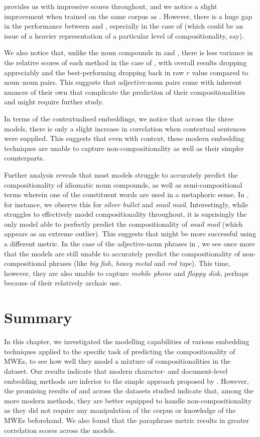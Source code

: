 \fasttext provides us with impressive scores throughout, and we notice a slight improvement when trained on the same corpus as \wordtovec. However, there is a huge gap in the performance between \wordtovec and \fasttext, especially in the case of \reddy (which could be an issue of a heavier representation of a particular level of compositionality, say).

We also notice that, unlike the noun compounds in \reddy and \ramisch, there is less variance in the relative scores of each method in the case of \discoj[ADJ], with overall results dropping appreciably and the best-performing \wordtovec dropping back in raw $r$ value compared to noun--noun pairs. This suggests that adjective-noun pairs come with inherent nuances of their own that complicate the prediction of their compositionalities and might require further study.

In terms of the contextualised embeddings, we notice that across the three models, there is only a slight increase in correlation when contextual sentences were supplied. This suggests that even with context, these modern embedding techniques are unable to capture non-compositionality as well as their simpler counterparts. 

Further analysis reveals that most models struggle to accurately predict the compositionality of idiomatic noun compounds, as well as semi-compositional terms wherein one of the constituent words are used in a metaphoric sense. In \reddy, for instance, we observe this for \textit{silver bullet} and \textit{snail mail}. Interestingly, while \bert struggles to effectively model compositionality throughout, it is suprisingly the only model able to perfectly predict the compositionality of \textit{snail mail} (which appears as an extreme outlier). This suggests that \bert might be more successful using a different metric. In the case of the adjective-noun phrases in \discoj, we see once more that the models are still unable to accurately predict the compositionality of non-compositional phrases (like \textit{big fish, heavy metal} and \textit{red tape}). This time, however, they are also unable to capture \textit{mobile phone} and \textit{floppy disk}, perhaps because of their relatively archaic use.

\section{Summary}
In this chapter, we investigated the modelling capabilities of various embedding techniques applied to the specific task of predicting the compositionality of MWEs, to see how well they model a mixture of compositionalities in the dataset. Our results indicate that modern character- and document-level embedding methods are inferior to the simple \wordtovec approach proposed by \cite{Salehi2015}. However, the promising results of \fasttext and \infersent across the datasets studied indicate that, among the more modern methods, they are better equipped to handle non-compositionality as they did not require any manipulation of the corpus or knowledge of the MWEs beforehand. We also found that the paraphrase metric results in greater correlation scores across the models.
